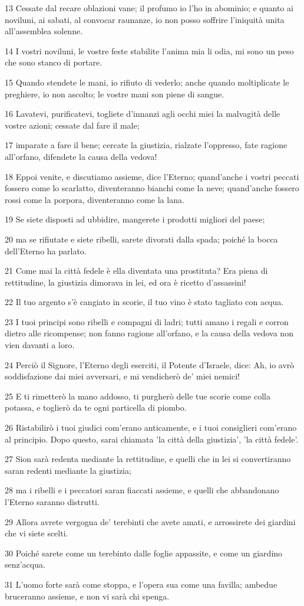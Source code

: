 \par 13 Cessate dal recare oblazioni vane; il profumo io l'ho in abominio; e quanto ai noviluni, ai sabati, al convocar raunanze, io non posso soffrire l'iniquità unita all'assemblea solenne.
\par 14 I vostri noviluni, le vostre feste stabilite l'anima mia li odia, mi sono un peso che sono stanco di portare.
\par 15 Quando stendete le mani, io rifiuto di vederlo; anche quando moltiplicate le preghiere, io non ascolto; le vostre mani son piene di sangue.
\par 16 Lavatevi, purificatevi, togliete d'innanzi agli occhi miei la malvagità delle vostre azioni; cessate dal fare il male;
\par 17 imparate a fare il bene; cercate la giustizia, rialzate l'oppresso, fate ragione all'orfano, difendete la causa della vedova!
\par 18 Eppoi venite, e discutiamo assieme, dice l'Eterno; quand'anche i vostri peccati fossero come lo scarlatto, diventeranno bianchi come la neve; quand'anche fossero rossi come la porpora, diventeranno come la lana.
\par 19 Se siete disposti ad ubbidire, mangerete i prodotti migliori del paese;
\par 20 ma se rifiutate e siete ribelli, sarete divorati dalla spada; poiché la bocca dell'Eterno ha parlato.
\par 21 Come mai la città fedele è ella diventata una prostituta? Era piena di rettitudine, la giustizia dimorava in lei, ed ora è ricetto d'assassini!
\par 22 Il tuo argento s'è cangiato in scorie, il tuo vino è stato tagliato con acqua.
\par 23 I tuoi principi sono ribelli e compagni di ladri; tutti amano i regali e corron dietro alle ricompense; non fanno ragione all'orfano, e la causa della vedova non vien davanti a loro.
\par 24 Perciò il Signore, l'Eterno degli eserciti, il Potente d'Israele, dice: Ah, io avrò soddisfazione dai miei avversari, e mi vendicherò de' miei nemici!
\par 25 E ti rimetterò la mano addosso, ti purgherò delle tue scorie come colla potassa, e toglierò da te ogni particella di piombo.
\par 26 Ristabilirò i tuoi giudici com'erano anticamente, e i tuoi consiglieri com'erano al principio. Dopo questo, sarai chiamata 'la città della giustizia', 'la città fedele'.
\par 27 Sion sarà redenta mediante la rettitudine, e quelli che in lei si convertiranno saran redenti mediante la giustizia;
\par 28 ma i ribelli e i peccatori saran fiaccati assieme, e quelli che abbandonano l'Eterno saranno distrutti.
\par 29 Allora avrete vergogna de' terebinti che avete amati, e arrossirete dei giardini che vi siete scelti.
\par 30 Poiché sarete come un terebinto dalle foglie appassite, e come un giardino senz'acqua.
\par 31 L'uomo forte sarà come stoppa, e l'opera sua come una favilla; ambedue bruceranno assieme, e non vi sarà chi spenga.

